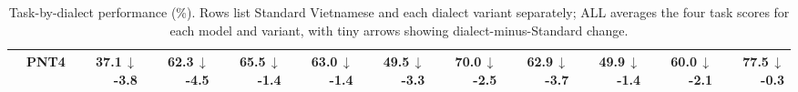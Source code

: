 \begin{table}[t]
{\begin{tabular}{llrrrrrrrrrr}
 & PNT4 & {\footnotesize 37.1}{\tiny\,$\downarrow$-3.8} & {\footnotesize 62.3}{\tiny\,$\downarrow$-4.5} & {\footnotesize 65.5}{\tiny\,$\downarrow$-1.4} & {\footnotesize 63.0}{\tiny\,$\downarrow$-1.4} & {\footnotesize 49.5}{\tiny\,$\downarrow$-3.3} & {\footnotesize 70.0}{\tiny\,$\downarrow$-2.5} & {\footnotesize 62.9}{\tiny\,$\downarrow$-3.7} & {\footnotesize 49.9}{\tiny\,$\downarrow$-1.4} & {\footnotesize 60.0}{\tiny\,$\downarrow$-2.1} & {\footnotesize 77.5}{\tiny\,$\downarrow$-0.3} \\
\bottomrule
\end{tabular}%
}
\caption{Task-by-dialect performance (\%). Rows list Standard Vietnamese and each dialect variant separately; ALL averages the four task scores for each model and variant, with tiny arrows showing dialect-minus-Standard change.}
\label{tab:task-dialect-performance-matrix}
\end{table}